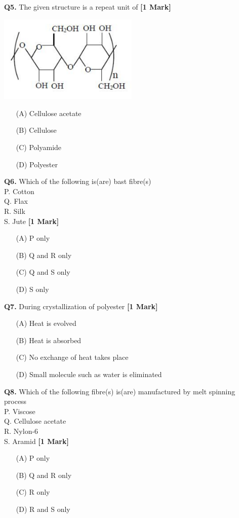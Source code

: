\documentclass[11pt]{article}
\newcommand{\questiona}[2]{
    \noindent\textbf{Q#2.} #1 \hfill \textbf{[1 Mark]}
}
\begin{document}
\questiona{The given structure is a repeat unit of}{5}
\begin{center}
\includegraphics[width=0.5\textwidth]{figures/5.png}
\end{center}
\begin{enumerate}
    \item[(A)] Cellulose acetate  
    \item[(B)] Cellulose  
    \item[(C)] Polyamide  
    \item[(D)] Polyester  
\end{enumerate}
\vspace{0.5cm}

\questiona{Which of the following is(are) bast fibre(s)\\
P. Cotton \\ 
Q. Flax  \\
R. Silk  \\
S. Jute  }{6}
\begin{enumerate}
    \item[(A)] P only  
    \item[(B)] Q and R only  
    \item[(C)] Q and S only  
    \item[(D)] S only  
\end{enumerate}
\vspace{0.5cm}

\questiona{During crystallization of polyester}{7}
\begin{enumerate}
    \item[(A)] Heat is evolved  
    \item[(B)] Heat is absorbed  
    \item[(C)] No exchange of heat takes place  
    \item[(D)] Small molecule such as water is eliminated  
\end{enumerate}
\vspace{0.5cm}

\questiona{Which of the following fibre(s) is(are) manufactured by melt spinning process\\
P. Viscose \\ 
Q. Cellulose acetate  \\
R. Nylon-6 \\ 
S. Aramid  }{8}
\begin{enumerate}
    \item[(A)] P only  
    \item[(B)] Q and R only  
    \item[(C)] R only  
    \item[(D)] R and S only  
\end{enumerate}
\vspace{0.5cm}
\end{document}
